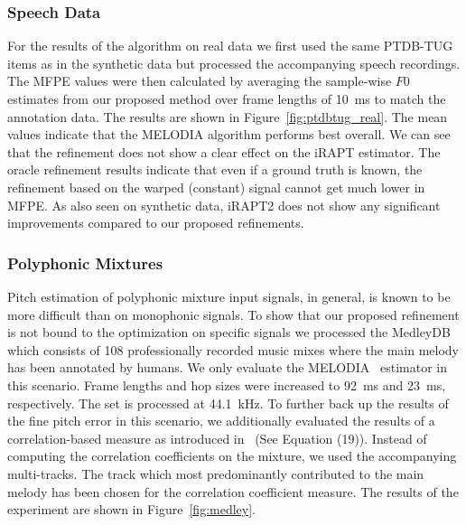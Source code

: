 \vspace{-0.6em}
\subsubsection{Speech Data} %
\label{ssub:speech}
For the results of the algorithm on real data we first used the same PTDB-TUG items as in the synthetic data but processed the accompanying speech recordings. The MFPE values were then calculated by averaging the sample-wise $F0$ estimates from our proposed method over frame lengths of 10~ms to match the annotation data. The results are shown in Figure~\ref{fig:ptdbtug_real}. The mean values indicate that the MELODIA algorithm performs best overall. We can see that the refinement does not show a clear effect on the iRAPT estimator. The oracle refinement results indicate that even if a ground truth is known, the refinement based on the warped (constant) signal cannot get much lower in MFPE. As also seen on synthetic data, iRAPT2 does not show any significant improvements compared to our proposed refinements.

\vspace{-0.6em}
\subsubsection{Polyphonic Mixtures} %
\label{ssub:polyphonic}

Pitch estimation of polyphonic mixture input signals, in general, is known to be more difficult than on monophonic signals. To show that our proposed refinement is not bound to the optimization on specific signals we processed the \mbox{MedleyDB}~\cite{MedleyDB} which consists of 108 professionally recorded music mixes where the main melody has been annotated by humans. We only evaluate the MELODIA~\cite{salamon14} estimator in this scenario. Frame lengths and hop sizes were increased to 92~ms and 23~ms, respectively. The set is processed at 44.1~kHz. To further back up the results of the fine pitch error in this scenario, we additionally evaluated the results of a correlation-based measure as introduced in~\cite{resch07} (See Equation (19)). Instead of computing the correlation coefficients on the mixture, we used the accompanying multi-tracks. The track which most predominantly contributed to the main melody has been chosen for the correlation coefficient measure. The results of the experiment are shown in Figure~\ref{fig:medley}.

